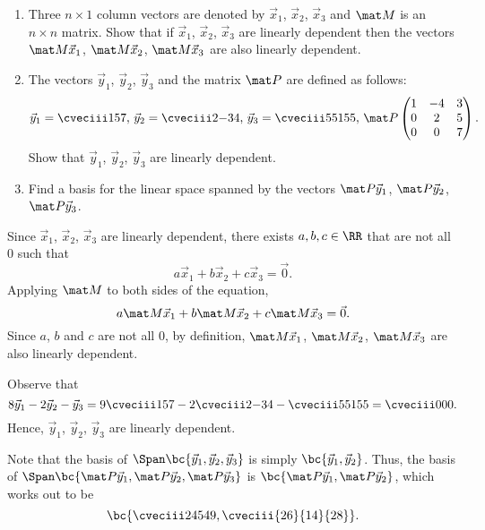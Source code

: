 \begin{problem}
    \begin{enumerate}
        \item Three $n \times 1$ column vectors are denoted by $\vec x_1$, $\vec x_2$, $\vec x_3$ and $\mat M$ is an $n \times n$ matrix. Show that if $\vec x_1$, $\vec x_2$, $\vec x_3$ are linearly dependent then the vectors $\mat M \vec x_1$, $\mat M \vec x_2$, $\mat M \vec x_3$ are also linearly dependent.
        \item The vectors $\vec y_1$, $\vec y_2$, $\vec y_3$ and the matrix $\mat P$ are defined as follows: \[\vec y_1 = \cveciii157, \, \vec y_2 = \cveciii2{-3}{4}, \, \vec y_3 = \cveciii5{51}{55}, \, \mat P \begin{pmatrix}1 & -4 & 3 \\ 0 & 2 & 5 \\ 0 & 0 & 7\end{pmatrix}.\] Show that $\vec y_1$, $\vec y_2$, $\vec y_3$ are linearly dependent.
        \item Find a basis for the linear space spanned by the vectors $\mat P \vec y_1$, $\mat P \vec y_2$, $\mat P \vec y_3$.
    \end{enumerate}
\end{problem}
\begin{solution}
    \begin{ppart}
        Since $\vec x_1$, $\vec x_2$, $\vec x_3$ are linearly dependent, there exists $a, b, c \in \RR$ that are not all 0 such that \[a \vec x_1 + b \vec x_2 + c \vec x_3 = \vec 0.\] Applying $\mat M$ to both sides of the equation, \[a \mat M \vec x_1 + b \mat M \vec x_2 + c \mat M \vec x_3 = \vec 0.\] Since $a$, $b$ and $c$ are not all 0, by definition, $\mat M \vec x_1$, $\mat M \vec x_2$, $\mat M \vec x_3$ are also linearly dependent.
    \end{ppart}
    \begin{ppart}
        Observe that \[8 \vec y_1 - 2 \vec y_2 - \vec y_3 = 9 \cveciii157 - 2 \cveciii2{-3}4 - \cveciii5{51}{55} = \cveciii000.\] Hence, $\vec y_1$, $\vec y_2$, $\vec y_3$ are linearly dependent.
    \end{ppart}
    \begin{ppart}
        Note that the basis of $\Span \bc{\vec y_1, \vec y_2, \vec y_3}$ is simply $\bc{\vec y_1, \vec y_2}$. Thus, the basis of $\Span \bc{\mat P \vec y_1, \mat P \vec y_2, \mat P \vec y_3}$ is $\bc{\mat P \vec y_1, \mat P \vec y_2}$, which works out to be \[\bc{\cveciii2{45}{49}, \cveciii{26}{14}{28}}.\]
    \end{ppart}
\end{solution}

